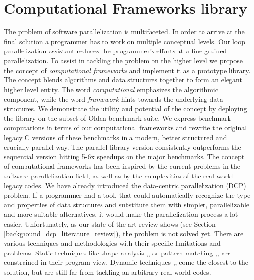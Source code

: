 \section{Computational Frameworks library}
\label{introduction_frameworks}
\quad The problem of software parallelization is multifaceted. In order to arrive at the final solution a programmer has to work on multiple conceptual levels. Our loop parallelization assistant reduces the programmer's efforts at a fine grained parallelization. To assist in tackling the problem on the higher level we propose the concept of \textit{computational frameworks} and implement it as a prototype library. The concept blends algorithms and data structures together to form an elegant higher level entity. The word \textit{computational} emphasizes the algorithmic component, while the word \textit{framework} hints towards the underlying data structures. We demonstrate the utility and potential of the concept by deploying the library on the subset of Olden benchmark suite. We express benchmark computations in terms of our computational frameworks and rewrite the original legacy C versions of these benchmarks in a modern, better structured and crucially parallel way. The parallel library version consistently outperforms the sequential version hitting 5-6x speedups on the major benchmarks.\newline\null
\quad The concept of computational frameworks has been inspired by the current problems in the software parallelization field, as well as by the complexities of the real world legacy codes. We have already introduced the data-centric parallelization (DCP) problem. If a programmer had a tool, that could automatically recognize the type and properties of data structures and substitute them with simpler, parallelizable and more suitable alternatives, it would make the parallelization process a lot easier. Unfortunately, as our state of the art review shows (see Section \ref{background_dcp_literature_review}), the problem is not solved yet. There are various techniques and methodologies with their specific limitations and problems. Static techniques like shape analysis \cite{Ghiya:1996:TDC:237721.237724},\cite{Sagiv:1999:PSA:292540.292552},\cite{Wilhelm:2000:SA:647476.760384} or pattern matching \cite{Ginsbach:2017:DEG:3049832.3049862},\cite{Ginsbach:2018:CDS:3178372.3179515},\cite{Ginsbach:2018:AML:3296957.3173182} are constrained in their program view. Dynamic techniques \cite{1669122},\cite{Haller:2016:SDS:2938006.2938029},\cite{Rupprecht:2017:DID:3155562.3155607} come the closest to the solution, but are still far from tackling an arbitrary real world codes.\newline\null
